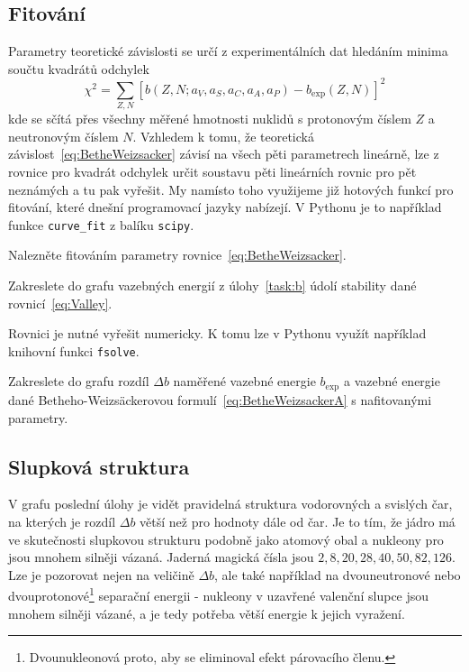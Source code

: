 \documentclass[a4paper,12pt,oneside]{article}
\def\code#1{\textnormal{\texttt{#1}}}
\theoremstyle{red}
\begin{document}
    \subsection{Fitování}
        Parametry teoretické závislosti se určí z experimentálních dat hledáním minima součtu kvadrátů odchylek
        \begin{equation}
            \chi^{2}=\sum_{Z,N}\left[b(Z,N;a_{V},a_{S},a_{C},a_{A},a_{P})-b_{\mathrm{exp}}(Z,N)\right]^{2}
        \end{equation}
        kde se sčítá přes všechny měřené hmotnosti nuklidů s protonovým číslem $Z$ a neutronovým číslem $N$.
        Vzhledem k tomu, že teoretická závislost~\eqref{eq:BetheWeizsacker} závisí na všech pěti parametrech lineárně, lze z rovnice pro kvadrát odchylek určit soustavu pěti lineárních rovnic pro pět neznámých a tu pak vyřešit.
        My namísto toho využijeme již hotových funkcí pro fitování, které dnešní programovací jazyky nabízejí.
        V Pythonu je to například funkce \code{curve\_fit} z balíku \code{scipy}.

        \begin{task}
            Nalezněte fitováním parametry rovnice~\eqref{eq:BetheWeizsacker}.
        \end{task}

        \begin{task}
            Zakreslete do grafu vazebných energií z úlohy~\ref{task:b} údolí stability dané rovnicí~\eqref{eq:Valley}.
        \end{task}
        Rovnici je nutné vyřešit numericky.
        K tomu lze v Pythonu využít například knihovní funkci \code{fsolve}.

        \begin{task}
            Zakreslete do grafu rozdíl $\Delta b$ naměřené vazebné energie $b_{\mathrm{exp}}$ a vazebné energie dané Betheho-Weizsäckerovou formulí~\eqref{eq:BetheWeizsackerA} s nafitovanými parametry.
        \end{task}

    \subsection{Slupková struktura}
        V grafu poslední úlohy je vidět pravidelná struktura vodorovných a svislých čar, na kterých je rozdíl $\Delta b$ větší než pro hodnoty dále od čar.
        Je to tím, že jádro má ve skutečnosti slupkovou strukturu podobně jako atomový obal a nukleony pro  jsou mnohem silněji vázaná.
        Jaderná magická čísla jsou $2,8,20,28,40,50,82,126$.
        Lze je pozorovat nejen na veličině $\Delta b$, ale také například na dvouneutronové nebo dvouprotonové\footnote{Dvounukleonová proto, aby se eliminoval efekt párovacího členu.} separační energii - nukleony v uzavřené valenční slupce jsou mnohem silněji vázané, a je tedy potřeba větší energie k jejich vyražení.
\end{document}
